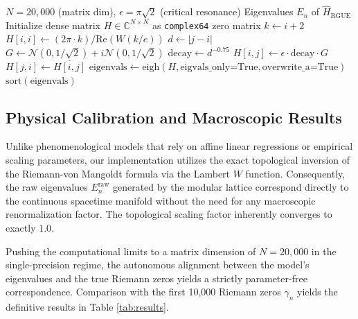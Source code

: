 \documentclass[prl,aps,floatfix,superscriptaddress,10pt]{revtex4-2}
\begin{document}
\begin{algorithm}[H]
\caption{Parameter-Free Riemann-GUE Ensemble Generation}
\label{alg:hamiltonian}
\begin{algorithmic}
\Require $N=20,000$ (matrix dim), $\epsilon=\pi\sqrt{2}$ (critical resonance)
\Ensure Eigenvalues $E_n$ of $\hat{H}_{\text{RGUE}}$
\State Initialize dense matrix $H \in \mathbb{C}^{N \times N}$ as \texttt{complex64} zero matrix
    \State $k \gets i+2$
    \State $H[i,i] \gets (2\pi \cdot k) / \text{Re}(W(k/e))$ 
        \State $d \gets |j-i|$
         
            \State $G \gets \mathcal{N}(0, 1/\sqrt{2}) + i\mathcal{N}(0, 1/\sqrt{2})$ 
            \State $\text{decay} \gets d^{-0.75}$ 
            \State $H[i,j] \gets \epsilon \cdot \text{decay} \cdot G$
            \State $H[j,i] \gets \overline{H[i,j]}$ 
        \EndIf
    \EndFor
\EndFor
\State $\text{eigenvals} \gets \text{eigh}(H, \text{eigvals\_only=True}, \text{overwrite\_a=True})$
\State \Return $\text{sort}(\text{eigenvals})$
\end{algorithmic}
\end{algorithm}

\subsection{Physical Calibration and Macroscopic Results}
Unlike phenomenological models that rely on affine linear regressions or empirical scaling parameters, our implementation utilizes the exact topological inversion of the Riemann-von Mangoldt formula via the Lambert $W$ function. Consequently, the raw eigenvalues $E_n^{\text{raw}}$ generated by the modular lattice correspond directly to the continuous spacetime manifold without the need for any macroscopic renormalization factor. The topological scaling factor inherently converges to exactly $1.0$.

Pushing the computational limits to a matrix dimension of $N=20,000$ in the single-precision regime, the autonomous alignment between the model's eigenvalues and the true Riemann zeros yields a strictly parameter-free correspondence. Comparison with the first 10,000 Riemann zeros $\gamma_n$ yields the definitive results in Table \ref{tab:results}.
\end{document}
